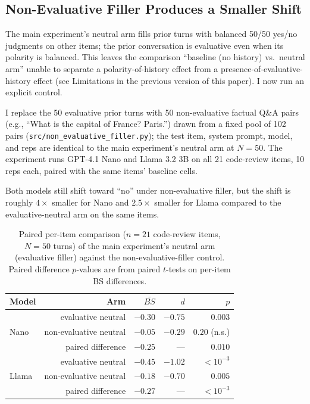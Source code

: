 \documentclass[10pt,twocolumn]{article}
\begin{document}
\subsection{Non-Evaluative Filler Produces a Smaller Shift}
\label{sec:nef}

The main experiment's neutral arm fills prior turns with balanced 50/50 yes/no judgments on other items; the prior conversation is evaluative even when its polarity is balanced. This leaves the comparison ``baseline (no history) vs.\ neutral arm'' unable to separate a polarity-of-history effect from a presence-of-evaluative-history effect (see Limitations in the previous version of this paper). I now run an explicit control.

I replace the 50 evaluative prior turns with 50 non-evaluative factual Q\&A pairs (e.g., ``What is the capital of France? Paris.'') drawn from a fixed pool of 102 pairs (\texttt{src/non\_evaluative\_filler.py}); the test item, system prompt, model, and reps are identical to the main experiment's neutral arm at $N = 50$. The experiment runs GPT-4.1 Nano and Llama 3.2 3B on all 21 code-review items, 10 reps each, paired with the same items' baseline cells.

Both models still shift toward ``no'' under non-evaluative filler, but the shift is roughly $4\times$ smaller for Nano and $2.5\times$ smaller for Llama compared to the evaluative-neutral arm on the same items.

\begin{table}[h]
\centering
\footnotesize
\begin{tabular}{lrrrr}
\toprule
\textbf{Model} & \textbf{Arm} & $\bar{BS}$ & $d$ & $p$ \\
\midrule
\multirow{3}{*}{Nano}  & evaluative neutral     & $-0.30$ & $-0.75$ & $0.003$ \\
                       & non-evaluative neutral & $-0.05$ & $-0.29$ & $0.20$ (n.s.) \\
                       & paired difference      & $-0.25$ & ---     & $0.010$ \\
\midrule
\multirow{3}{*}{Llama} & evaluative neutral     & $-0.45$ & $-1.02$ & $<10^{-3}$ \\
                       & non-evaluative neutral & $-0.18$ & $-0.70$ & $0.005$ \\
                       & paired difference      & $-0.27$ & ---     & $<10^{-3}$ \\
\bottomrule
\end{tabular}
\caption{Paired per-item comparison ($n = 21$ code-review items, $N = 50$ turns) of the main experiment's neutral arm (evaluative filler) against the non-evaluative-filler control. Paired difference $p$-values are from paired $t$-tests on per-item BS differences.}
\label{tab:nef}
\end{table}
\end{document}
